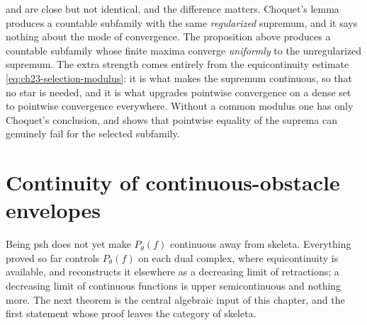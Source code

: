 \begin{remark}
\label{rem:ch23-selection-vs-choquet}
 and
 are close but not identical, and the
difference matters.  Choquet's lemma
 produces a countable subfamily with the same
\emph{regularized} supremum, and it says nothing about the mode of
convergence.  The proposition above produces a countable subfamily whose
finite maxima converge \emph{uniformly} to the unregularized supremum.  The
extra strength comes entirely from the equicontinuity estimate
\eqref{eq:ch23-selection-modulus}: it is what makes the supremum continuous,
so that no star is needed, and it is what upgrades pointwise convergence on
a dense set to pointwise convergence everywhere.  Without a common modulus
one has only Choquet's conclusion, and
 shows that pointwise equality of the
suprema can genuinely fail for the selected subfamily.
\end{remark}

\section{Continuity of continuous-obstacle envelopes}
\label{sec:ch23-continuity}

Being psh does not yet make \(P_\theta(f)\) continuous away from skeleta.
Everything proved so far controls \(P_\theta(f)\) on each dual complex, where
equicontinuity is available, and reconstructs it elsewhere as a decreasing
limit of retractions; a decreasing limit of continuous functions is upper
semicontinuous and nothing more.  The next theorem is the central algebraic
input of this chapter, and the first statement whose proof leaves the
category of skeleta.

\begin{center}
\end{center}

